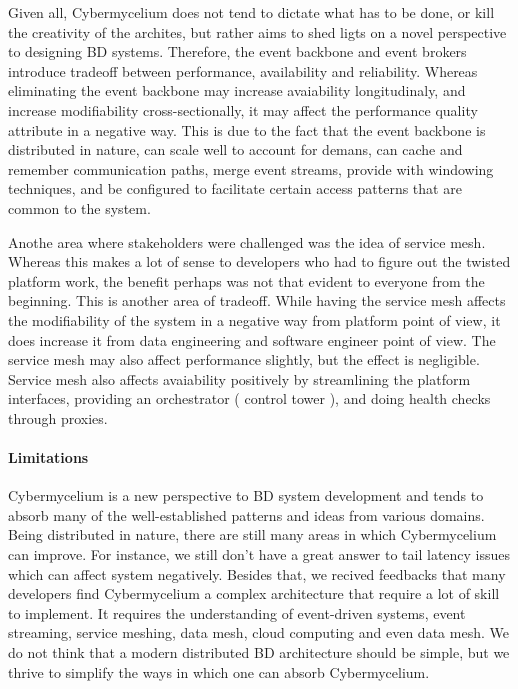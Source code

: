 \documentclass{bmcart}
\begin{document}
Given all, Cybermycelium does not tend to dictate what has to be done, or kill the creativity of the archites, but rather aims to shed ligts on a novel perspective to designing BD systems. Therefore, the event backbone and event brokers introduce tradeoff between performance, availability and reliability. Whereas eliminating the event backbone may increase avaiability longitudinaly, and increase modifiability cross-sectionally, it may affect the performance quality attribute in a negative way. This is due to the fact that the event backbone is distributed in nature, can scale well to account for demans, can cache and remember communication paths, merge event streams, provide with windowing techniques, and be configured to facilitate certain access patterns that are common to the system.

Anothe area where stakeholders were challenged was the idea of service mesh. Whereas this makes a lot of sense to developers who had to figure out the twisted platform work, the benefit perhaps was not that evident to everyone from the beginning. This is another area of tradeoff. While having the service mesh affects the modifiability of the system in a negative way from platform point of view, it does increase it from data engineering and software engineer point of view. The service mesh may also affect performance slightly, but the effect is negligible. Service mesh also affects avaiability positively by streamlining the platform interfaces, providing an orchestrator ( control tower ), and doing health checks through proxies.

\paragraph{Limitations}

Cybermycelium is a new perspective to BD system development and tends to absorb many of the well-established patterns and ideas from various domains. Being distributed in nature, there are still many areas in which Cybermycelium can improve. For instance, we still don't have a great answer to tail latency issues which can affect system negatively. Besides that, we recived feedbacks that many developers find Cybermycelium a complex architecture that require a lot of skill to implement. It requires the understanding of event-driven systems, event streaming, service meshing, data mesh, cloud computing and even data mesh. We do not think that a modern distributed BD architecture should be simple, but we thrive to simplify the ways in which one can absorb Cybermycelium.
\end{document}
